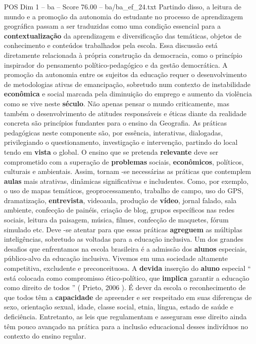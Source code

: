 \begin{textsample}{POS Dim 1 – ba – Score 76.00 – ba/ba\_ef\_24.txt}
Partindo disso, a leitura de mundo e a promoção da autonomia do estudante no processo de aprendizagem geográfica passam a ser traduzidas como uma condição essencial para a \textbf{contextualização} da aprendizagem e diversificação das temáticas, objetos de conhecimento e conteúdos trabalhados pela escola.
Essa discussão está diretamente relacionada à própria construção da democracia, como o princípio inspirador do pensamento político-pedagógico e da gestão democrática.
A promoção da autonomia entre os sujeitos da educação requer o desenvolvimento de metodologias ativas de emancipação, sobretudo num contexto de instabilidade \textbf{econômica} e social marcada pela diminuição do emprego e aumento da violência como se vive neste \textbf{século}.
Não apenas pensar o mundo criticamente, mas também o desenvolvimento de atitudes responsáveis e éticas diante da realidade concreta são princípios fundantes para o ensino da Geografia.
As práticas pedagógicas neste componente são, por essência, interativas, dialogadas, privilegiando o questionamento, investigação e intervenção, partindo do local tendo em \textbf{vista} o global.
O ensino que se pretenda \textbf{relevante} deve ser comprometido com a superação de \textbf{problemas} sociais, \textbf{econômicos}, políticos, culturais e ambientais.
Assim, tornam -se necessárias as práticas que contemplem \textbf{aulas} mais atrativas, dinâmicas significativas e includentes.
Como, por exemplo, o uso de mapas temáticos, geoprocessamento, trabalho de campo, uso do GPS, dramatização, \textbf{entrevista}, videoaula, produção de \textbf{vídeo}, jornal falado, sala ambiente, confecção de painéis, criação de blog, grupos específicos nas redes sociais, leitura da paisagem, música, filmes, confecção de maquetes, fórum simulado etc.
Deve -se atentar para que essas práticas \textbf{agreguem} as múltiplas inteligências, sobretudo as voltadas para a educação inclusiva.
Um dos grandes desafios que enfrentamos na escola brasileira é a admissão dos \textbf{alunos} especiais, público-alvo da educação inclusiva.
Vivemos em uma sociedade altamente competitiva, excludente e preconceituosa.
A \textbf{devida} inserção do \textbf{aluno} especial “ está colocada como compromisso ético-político, que \textbf{implica} garantir a educação como direito de todos ” ( Prieto, 2006 ).
É dever da escola o reconhecimento de que todos têm a \textbf{capacidade} de apreender e ser respeitado em suas diferenças de sexo, orientação sexual, idade, classe social, etnia, língua, estado de saúde e deficiência.
Entretanto, as leis que regulamentam e asseguram esse direito ainda têm pouco avançado na prática para a inclusão educacional desses indivíduos no contexto do ensino regular.

\end{textsample}
